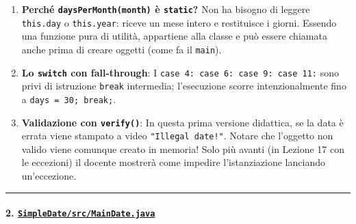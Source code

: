 \documentclass[11pt,a4paper]{article}
\newcommand{\passthrough}[1]{#1}
\providecommand{\tightlist}{\setlength{\itemsep}{0pt}\setlength{\parskip}{0pt}}
\begin{document}
\begin{enumerate}
\def\labelenumi{\arabic{enumi}.}
\tightlist
\item
  \textbf{Perché \passthrough{\lstinline!daysPerMonth(month)!} è
  \passthrough{\lstinline!static!}?} Non ha bisogno di leggere
  \passthrough{\lstinline!this.day!} o
  \passthrough{\lstinline!this.year!}: riceve un mese intero e
  restituisce i giorni. Essendo una funzione pura di utilità, appartiene
  alla classe e può essere chiamata anche prima di creare oggetti (come
  fa il \passthrough{\lstinline!main!}).
\item
  \textbf{Lo \passthrough{\lstinline!switch!} con fall-through}: I
  \passthrough{\lstinline!case 4: case 6: case 9: case 11:!} sono privi
  di istruzione \passthrough{\lstinline!break!} intermedia; l'esecuzione
  scorre intenzionalmente fino a
  \passthrough{\lstinline!days = 30; break;!}.
\item
  \textbf{Validazione con \passthrough{\lstinline!verify()!}}: In questa
  prima versione didattica, se la data è errata viene stampato a video
  \passthrough{\lstinline'"Illegal date!"'}. Notare che l'oggetto non
  valido viene comunque creato in memoria! Solo più avanti (in Lezione
  17 con le eccezioni) il docente mostrerà come impedire l'istanziazione
  lanciando un'eccezione.
\end{enumerate}

\begin{center}\rule{0.5\linewidth}{0.5pt}\end{center}

\paragraph{\texorpdfstring{2.
\href{file:///home/wally/Documenti/GitHub/Programmazione-II/25-26/Teoria-e-Esercitazioni/Codice-20260902/Lezioni05-06/SimpleDate/src/MainDate.java}{\texttt{SimpleDate/src/MainDate.java}}}{2. SimpleDate/src/MainDate.java}}\label{simpledatesrcmaindate.java}
\end{document}
